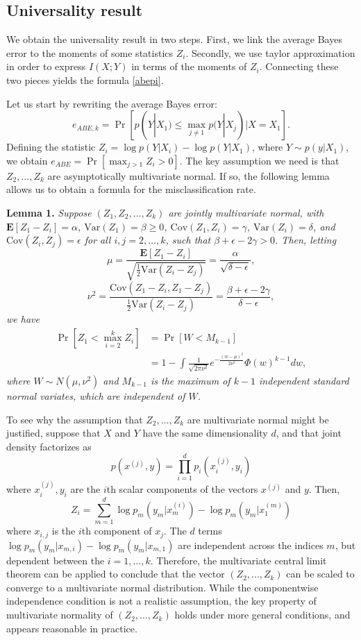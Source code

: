 \documentclass{article}
\newcommand{\E}{\textbf{E}}
\newcommand{\Cov}{\text{Cov}}
\newcommand{\Var}{\text{Var}}
\begin{document}
\subsection{Universality result}

We obtain the universality result in two steps.  First, we link the
average Bayes error to the moments of some statistics $Z_i$.
Secondly, we use taylor approximation in order to express $I(X; Y)$ in
terms of the moments of $Z_i$.  Connecting these two pieces yields the
formula \eqref{abepi}.

Let us start by rewriting the average Bayes error:
\[
e_{ABE, k} = \Pr[p(Y|X_1) \leq \max_{j \neq 1} p(Y|X_j)| X = X_1].
\]
Defining the statistic $Z_i = \log p(Y|X_i) - \log p(Y|X_1)$, where $Y
\sim p(y|X_1)$, we obtain $ e_{ABE} = \Pr[\max_{j > 1} Z_i > 0].  $
The key assumption we need is that $Z_2,\hdots, Z_k$ are
asymptotically multivariate normal.  If so, the following lemma allows
us to obtain a formula for the misclassification rate.

\textbf{Lemma 1. }
\emph{
Suppose $(Z_1, Z_2, \hdots, Z_k)$ are jointly multivariate normal, with 
$\E[Z_1 - Z_i]= \alpha$, 
$\Var(Z_1) = \beta \geq 0$, 
$\Cov(Z_1, Z_i) = \gamma$, 
$\Var(Z_i)= \delta$, and $\Cov(Z_i, Z_j) = \epsilon$ for all $i, j = 2, \hdots,
k$, such that $\beta + \epsilon - 2\gamma > 0$.  Then, letting
\[
\mu = \frac{\E[Z_1 - Z_i]}{\sqrt{\frac{1}{2}\Var(Z_i - Z_j)}} = \frac{\alpha}{\sqrt{\delta - \epsilon}},
\]
\[
\nu^2 = \frac{\Cov(Z_1 -Z_i, Z_1 - Z_j)}{\frac{1}{2}\Var(Z_i - Z_j)} = \frac{\beta + \epsilon - 2\gamma}{\delta - \epsilon},
\]
we have
\begin{align*}
\Pr[Z_1 < \max_{i=2}^k Z_i] &= \Pr[W < M_{k-1}]
\\&= 1 - \int \frac{1}{\sqrt{2\pi\nu^2}} e^{-\frac{(w-\mu)^2}{2\nu^2}} \Phi(w)^{k-1} dw,
\end{align*}
where $W \sim N(\mu, \nu^2)$ and $M_{k-1}$ is the maximum of $k-1$
independent standard normal variates, which are independent of $W$.
}

To see why the assumption that $Z_2,\hdots, Z_k$ are multivariate normal might be justified, suppose that $X$ and $Y$ have the same dimensionality $d$, and that
joint density factorizes as
\[
p(x^{(j)}, y) = \prod_{i=1}^d p_i(x^{(j)}_i, y_i)
\]
where $x_i^{(j)}, y_i$ are the $i$th scalar components of the vectors $x^{(j)}$ and $y$.
Then,
\[
Z_i = \sum_{m=1}^d \log p_m(y_m | x^{(i)}_m) - \log p_m(y_m | x^{(m)}_1)
\]
where $x_{i, j}$ is the $i$th component of $x_j$.  The $d$ terms $\log
p_m(y_m | x_{m, i}) - \log p_m(y_m | x_{m, 1})$ are independent across
the indices $m$, but dependent between the $i = 1,\hdots, k$.
Therefore, the multivariate central limit theorem can be applied to
conclude that the vector $(Z_2,\hdots, Z_k)$ can be scaled to converge
to a multivariate normal distribution.  While the componentwise
independence condition is not a realistic assumption, the key property
of multivariate normality of $(Z_2,\hdots, Z_k)$ holds under more
general conditions, and appears reasonable in practice.
\end{document}
